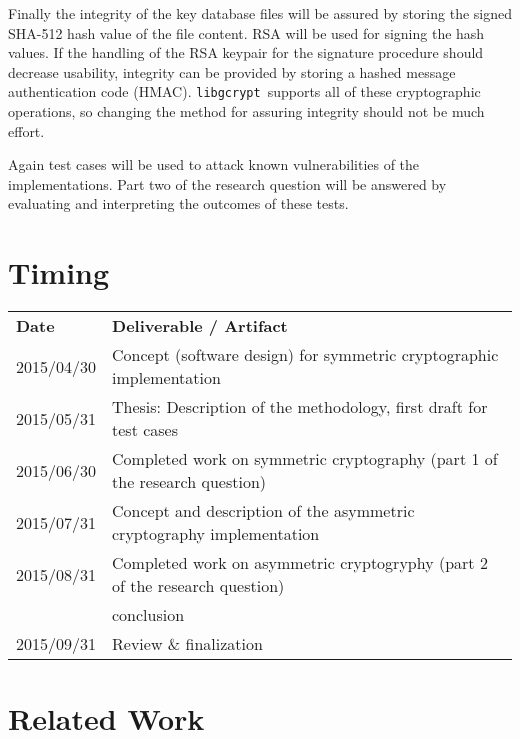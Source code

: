 \documentclass[a4paper,12pt]{article}
\newcommand{\libgcrypt}{\texttt{libgcrypt}~}
\begin{document}
Finally the integrity of the key database files will be assured by storing the signed SHA-512 hash value of the file content. RSA will be used for signing the hash values. If the handling of the RSA keypair for the signature procedure should decrease usability, integrity can be provided by storing a hashed message authentication code (HMAC). \libgcrypt supports all of these cryptographic operations, so changing the method for assuring integrity should not be much effort.

Again test cases will be used to attack known vulnerabilities of the implementations. Part two of the research question will be answered by evaluating and interpreting the outcomes of these tests.


\section{Timing}

\begin{table}[h]
\begin{tabular}{ll}
\textbf{Date} & \textbf{Deliverable / Artifact} \\
2015/04/30 & Concept (software design) for symmetric cryptographic implementation \\
2015/05/31 & Thesis: Description of the methodology, first draft for test cases \\
2015/06/30 & Completed work on symmetric cryptography (part 1 of the research question) \\
2015/07/31 & Concept and description of the asymmetric cryptography implementation \\
2015/08/31 & Completed work on asymmetric cryptogryphy (part 2 of the research question) \\
~          & conclusion \\ 
2015/09/31 & Review \& finalization
\end{tabular}
\end{table}

\section{Related Work}

\begingroup
\renewcommand{\section}[2]{}
\renewcommand{\refname}{}
\nocite{*}


\endgroup
\end{document}
